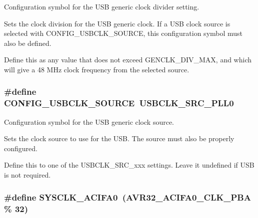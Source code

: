 \-Configuration symbol for the \-U\-S\-B generic clock divider setting. 

\-Sets the clock division for the \-U\-S\-B generic clock. \-If a \-U\-S\-B clock source is selected with \-C\-O\-N\-F\-I\-G\-\_\-\-U\-S\-B\-C\-L\-K\-\_\-\-S\-O\-U\-R\-C\-E, this configuration symbol must also be defined.

\-Define this as any value that does not exceed {\ttfamily \-G\-E\-N\-C\-L\-K\-\_\-\-D\-I\-V\-\_\-\-M\-A\-X}, and which will give a 48 \-M\-Hz clock frequency from the selected source. \hypertarget{group__sysclk__group_ga2ea7011abd3d43ef751313c6fc8c2068}{
\subsubsection[{\-C\-O\-N\-F\-I\-G\-\_\-\-U\-S\-B\-C\-L\-K\-\_\-\-S\-O\-U\-R\-C\-E}]{\setlength{\rightskip}{0pt plus 5cm}\#define \-C\-O\-N\-F\-I\-G\-\_\-\-U\-S\-B\-C\-L\-K\-\_\-\-S\-O\-U\-R\-C\-E~\-U\-S\-B\-C\-L\-K\-\_\-\-S\-R\-C\-\_\-\-P\-L\-L0}}
\label{group__sysclk__group_ga2ea7011abd3d43ef751313c6fc8c2068}


\-Configuration symbol for the \-U\-S\-B generic clock source. 

\-Sets the clock source to use for the \-U\-S\-B. \-The source must also be properly configured.

\-Define this to one of the {\ttfamily \-U\-S\-B\-C\-L\-K\-\_\-\-S\-R\-C\-\_\-xxx} settings. \-Leave it undefined if \-U\-S\-B is not required. \hypertarget{group__sysclk__group_ga3d96f4df476b374cae0653bb97b6afa9}{
\subsubsection[{\-S\-Y\-S\-C\-L\-K\-\_\-\-A\-C\-I\-F\-A0}]{\setlength{\rightskip}{0pt plus 5cm}\#define \-S\-Y\-S\-C\-L\-K\-\_\-\-A\-C\-I\-F\-A0~(\-A\-V\-R32\-\_\-\-A\-C\-I\-F\-A0\-\_\-\-C\-L\-K\-\_\-\-P\-B\-A \% 32)}}
\label{group__sysclk__group_ga3d96f4df476b374cae0653bb97b6afa9}



